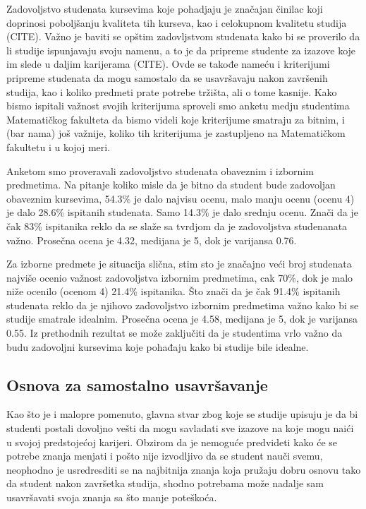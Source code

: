 \documentclass[a4paper]{article}
\begin{document}
Zadovoljstvo studenata kursevima koje pohadjaju je značajan činilac koji doprinosi poboljšanju kvaliteta tih kurseva, kao i celokupnom kvalitetu studija (CITE). Važno je baviti se opštim zadovljstvom studenata kako bi se proverilo da li studije ispunjavaju svoju namenu, a to je da pripreme studente za izazove koje im slede u daljim karijerama (CITE). Ovde se takođe nameću i kriterijumi pripreme studenata da mogu samostalo da se usavršavaju nakon završenih studija, kao i koliko predmeti prate potrebe tržišta, ali o tome kasnije.
Kako bismo ispitali važnost svojih kriterijuma sproveli smo anketu medju studentima Matematičkog fakulteta da bismo videli koje kriterijume smatraju za bitnim, i (bar nama) još važnije, koliko tih kriterijuma je zastupljeno na Matematičkom fakultetu i u kojoj meri.

Anketom smo proveravali zadovoljstvo studenata obaveznim i izbornim predmetima. Na pitanje koliko misle da je bitno da student bude zadovoljan obaveznim kursevima, 54.3\% je dalo najvisu ocenu, malo manju ocenu (ocenu 4) je dalo 28.6\% ispitanih studenata. Samo  14.3\% je dalo srednju ocenu. Znači da je čak 83\% ispitanika reklo da se slaže sa tvrdjom da je zadovoljstva studenanata važno. Prosečna ocena je 4.32, medijana je 5, dok je varijansa 0.76.

Za izborne predmete je situacija slična, stim sto je značajno veći broj studenata najviše ocenio važnost zadovoljstva izbornim predmetima, cak 70\%, dok je malo niže ocenilo (ocenom 4) 21.4\% ispitanika. Što znači da je čak 91.4\% ispitanih studenata reklo da je njihovo zadovoljstvo izbornim predmetima važno kako bi se studije smatrale idealnim. Prosečna ocena je 4.58, medijana je 5, dok je varijansa 0.55. Iz prethodnih rezultat se može zaključiti da je studentima vrlo važno da budu zadovoljni kursevima koje pohađaju kako bi studije bile idealne.


\subsection{Osnova za samostalno usavršavanje}
\label{subsec:samostalno_usavršavanje}
Kao što je i malopre pomenuto, glavna stvar zbog koje se studije upisuju je da bi studenti postali dovoljno vešti da mogu savladati sve izazove na koje mogu naići u svojoj predstojećoj karijeri. Obzirom da je nemoguće predvideti kako će se potrebe znanja menjati i pošto nije izvodljivo da se student nauči svemu, neophodno je usredresditi se na najbitnija znanja koja pružaju dobru osnovu tako da student nakon završetka studija, shodno potrebama može nadalje sam usavršavati svoja znanja sa što manje poteškoća.
\end{document}

